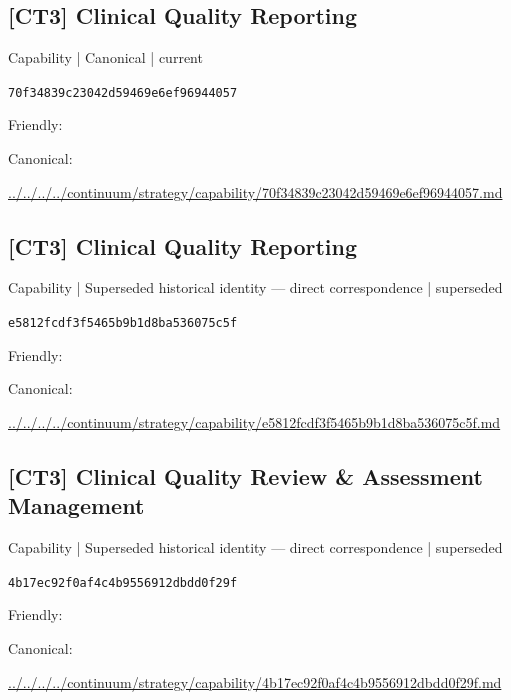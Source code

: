 \documentclass[10pt,a4paper]{article}
\begin{document}
\subsection*{[CT3] Clinical Quality Reporting}
{\small Capability | Canonical | current}\par
\texttt{70f34839c23042d59469e6ef96944057}\par
Friendly: \par
Canonical: \par
{\footnotesize\url{../../../../continuum/strategy/capability/70f34839c23042d59469e6ef96944057.md}}\par
\subsection*{[CT3] Clinical Quality Reporting}
{\small Capability | Superseded historical identity — direct correspondence | superseded}\par
\texttt{e5812fcdf3f5465b9b1d8ba536075c5f}\par
Friendly: \par
Canonical: \par
{\footnotesize\url{../../../../continuum/strategy/capability/e5812fcdf3f5465b9b1d8ba536075c5f.md}}\par
\subsection*{[CT3] Clinical Quality Review \& Assessment Management}
{\small Capability | Superseded historical identity — direct correspondence | superseded}\par
\texttt{4b17ec92f0af4c4b9556912dbdd0f29f}\par
Friendly: \par
Canonical: \par
{\footnotesize\url{../../../../continuum/strategy/capability/4b17ec92f0af4c4b9556912dbdd0f29f.md}}\par
\end{document}
